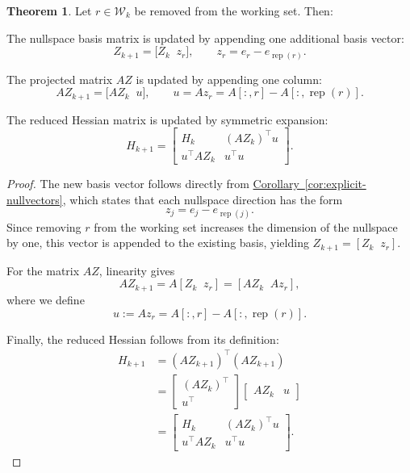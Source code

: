 \documentclass{book}
\theoremstyle{definition}
\newtheorem{theorem}{Theorem}[section]
\newcommand{\corref}[1]{\hyperref[#1]{Corollary~\ref*{#1}}}
\numberwithin{algorithm_}{chapter}
\begin{document}
{\begin{theorem}
\label{thm:working-set-reduction-update}
Let \(r \in \mathcal{W}_k\) be removed from the working set. Then:

The nullspace basis matrix is updated by appending one additional basis vector:
    \begin{equation}
    Z_{k+1} = \bigl[ Z_k \;\; z_r \bigr],
    \qquad
    z_r = e_r - e_{\operatorname{rep}(r)}.
    \end{equation}

The projected matrix \(AZ\) is updated by appending one column:
    \begin{equation}
    AZ_{k+1} = \bigl[ AZ_k \;\; u \bigr],
    \qquad
    u = A z_r = A[:,r] - A[:,\operatorname{rep}(r)].
    \end{equation}

The reduced Hessian matrix is updated by symmetric expansion:
    \begin{equation}
    H_{k+1}
    =
    \begin{bmatrix}
    H_k & (AZ_k)^\top u \\
    u^\top AZ_k & u^\top u
    \end{bmatrix}.
    \end{equation}

\begin{proof}
The new basis vector follows directly from \corref{cor:explicit-nullvectors}, which states that each nullspace direction has the form
\[
z_j = e_j - e_{\operatorname{rep}(j)}.
\]
Since removing \(r\) from the working set increases the dimension of the nullspace by one, this vector is appended to the existing basis, yielding
$Z_{k+1} = [Z_k \;\; z_r]$.

\medskip	

For the matrix \(AZ\), linearity gives
\[
AZ_{k+1} = A[Z_k \;\; z_r] = [AZ_k \;\; A z_r],
\]
where we define
\[
u := A z_r = A[:,r] - A[:,\operatorname{rep}(r)].
\]

Finally, the reduced Hessian follows from its definition:
\begin{align*}
H_{k+1}
&= (AZ_{k+1})^\top (AZ_{k+1}) \\[0.8em]
&=
\begin{bmatrix}
(AZ_k)^\top \\[0.4em]
u^\top
\end{bmatrix}
\begin{bmatrix}
AZ_k & u
\end{bmatrix} \\[0.8em]
&=
\begin{bmatrix}
H_k & (AZ_k)^\top u \\[0.4em]
u^\top AZ_k & u^\top u
\end{bmatrix}.
\end{align*}


\end{proof}
\end{theorem}}
\end{document}

